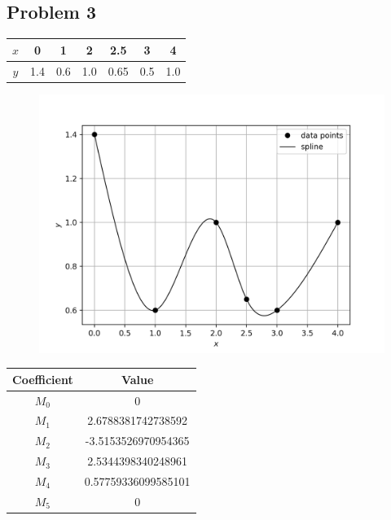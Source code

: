 \documentclass[12,a4paper]{article}
\begin{document}
    \subsection*{Problem 3}
    \begin{table}[H]
        \centering
        \begin{tabular}{ |c|c|c|c|c|c|c| }
            \hline
            $x$ & 0 & 1 & 2 & 2.5 & 3 & 4\\
            \hline
            $y$ & 1.4 & 0.6 & 1.0 & 0.65 & 0.5 & 1.0\\
            \hline
        \end{tabular}
    \end{table}
    \begin{figure}[H]
        \centering
        \includegraphics[width=\textwidth]{plots/q3c.png}
        \label{fig:my_label}
    \end{figure}
    \begin{table}[H]
        \centering
        \begin{tabular}{ |c|c|}
            \hline
            \textbf{Coefficient} & \textbf{Value}\\
            \hline
            $M_0$ & 0\\
            $M_1$ & 2.6788381742738592\\
            $M_2$ & -3.5153526970954365\\
            $M_3$ & 2.5344398340248961\\
            $M_4$ & 0.57759336099585101\\
            $M_5$ & 0\\
            \hline
        \end{tabular}
    \end{table}
    \newpage
\end{document}

